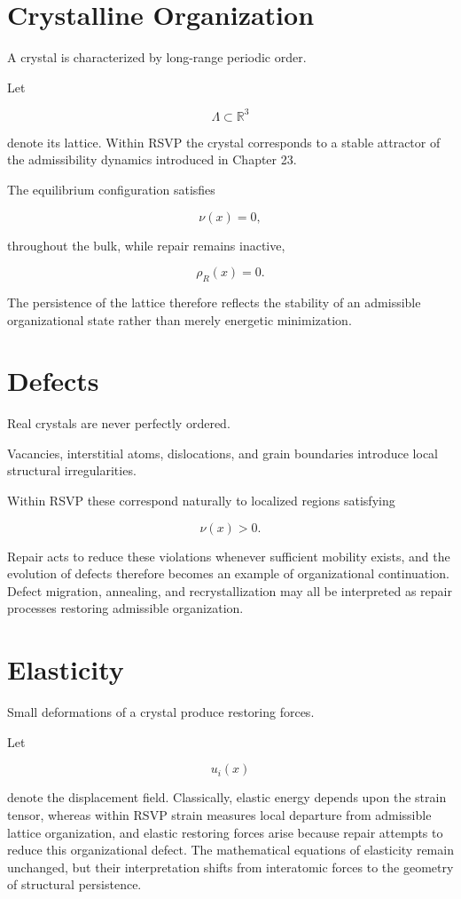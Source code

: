 \documentclass[11pt,oneside]{book}
\numberwithin{equation}{chapter}
\theoremstyle{definition}
\theoremstyle{plain}
\begin{document}
\section{Crystalline Organization}

A crystal is characterized by long-range periodic order.

Let

\[
\Lambda
\subset
\mathbb R^3
\]

denote its lattice. Within RSVP the crystal corresponds to a stable attractor of the admissibility dynamics introduced in Chapter 23.

The equilibrium configuration satisfies

\[
\nu(x)=0,
\]

throughout the bulk, while repair remains inactive,

\[
\rho_R(x)=0.
\]

The persistence of the lattice therefore reflects the stability of an
admissible organizational state rather than merely energetic minimization.

\section{Defects}

Real crystals are never perfectly ordered.

Vacancies, interstitial atoms, dislocations, and grain boundaries introduce
local structural irregularities.

Within RSVP these correspond naturally to localized regions satisfying

\[
\nu(x)>0.
\]

Repair acts to reduce these violations whenever sufficient mobility exists, and the evolution of defects therefore becomes an example of organizational continuation. Defect migration, annealing, and recrystallization may all be interpreted as repair processes restoring admissible organization.

\section{Elasticity}

Small deformations of a crystal produce restoring forces.

Let

\[
u_i(x)
\]

denote the displacement field. Classically, elastic energy depends upon the strain tensor, whereas within RSVP strain measures local departure from admissible lattice organization, and elastic restoring forces arise because repair attempts to reduce this organizational defect. The mathematical equations of elasticity remain unchanged, but their interpretation shifts from interatomic forces to the geometry of structural persistence.
\end{document}
